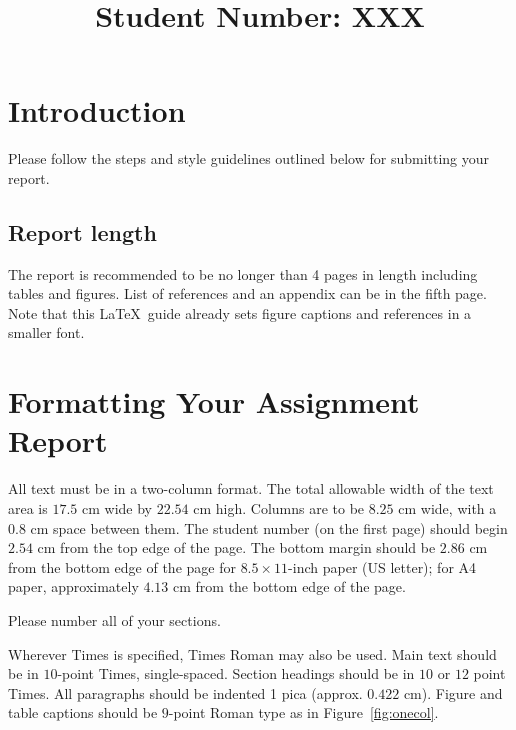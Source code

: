 \documentclass[10pt,twocolumn,letterpaper]{article}
\begin{document}
\title{Student Number: XXX}  %

\maketitle
\thispagestyle{empty}


\section{Introduction}

Please follow the steps and style guidelines outlined below for submitting your report.


\subsection{Report length}
The report is recommended to be no longer than 4 pages in length including tables and figures. List of references and an appendix can be in the fifth page. Note that this \LaTeX\ guide already sets figure captions and references in a smaller font.

\section{Formatting Your Assignment Report}

All text must be in a two-column format. The total allowable width of the text area is $17.5$ cm wide by $22.54$ cm high. Columns are to be $8.25$ cm wide, with a $0.8$ cm space between them. The student number (on the first page) should begin $2.54$ cm from the top edge of the page.  The bottom margin should be $2.86$ cm from the bottom edge of the page for $8.5 \times 11$-inch paper (US letter); for A4 paper, approximately $4.13$ cm from the bottom edge of the page.

Please number all of your sections.

Wherever Times is specified, Times Roman may also be used.  Main text should be in $10$-point Times, single-spaced. Section headings should be in $10$ or $12$ point Times.  All paragraphs should be indented 1 pica (approx. $0.422$ cm).  Figure and table captions should be $9$-point Roman type as in 
Figure~\ref{fig:onecol}.
\end{document}
